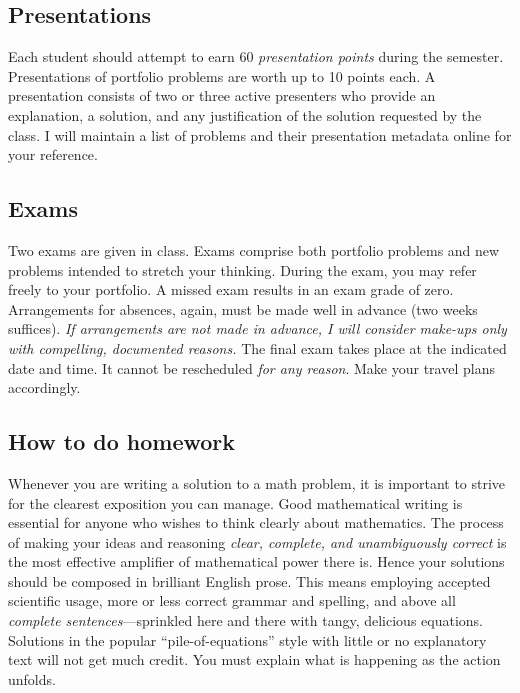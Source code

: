 \documentclass[symmetric]{tufte-handout}
\begin{document}
\subsection{Presentations}

    Each student should attempt to earn 60 \emph{presentation points} during
    the semester. Presentations of portfolio problems are worth up to 10
    points each. A presentation consists of two or three active presenters who
    provide an explanation, a solution, and any justification of the solution
    requested by the class. I will maintain a list of
    problems and their presentation metadata online for your reference.

\subsection{Exams}

    Two exams are given in class. Exams comprise both
    portfolio problems and new problems intended to stretch your thinking. During
    the exam, you may refer freely to your portfolio. A missed exam results in an
    exam grade of zero. Arrangements for absences, again, must be made well in
    advance (two weeks suffices). \emph{If arrangements are not made in advance, I
    will consider make-ups only with compelling, documented reasons.} The final
    exam takes place at the indicated date and time. It cannot be rescheduled
    \emph{for any reason}. Make your travel plans accordingly.

    

\subsection{How to do homework}

Whenever you are writing a solution to a math problem, it is important to
strive for the clearest exposition you can manage. Good mathematical writing
is essential for anyone who wishes to think clearly about mathematics. The
process of making your ideas and reasoning \emph{clear, complete, and
unambiguously correct} is the most effective amplifier of mathematical power
there is. Hence your solutions should be composed in brilliant English prose.
This means employing accepted scientific usage, more or less correct grammar
and spelling, and above all \emph{complete sentences}---sprinkled here and
there with tangy, delicious equations. Solutions in the popular 
``pile-of-equations'' style with little or no explanatory text will not get much credit.
You must explain what is happening as the action unfolds.
\end{document}
